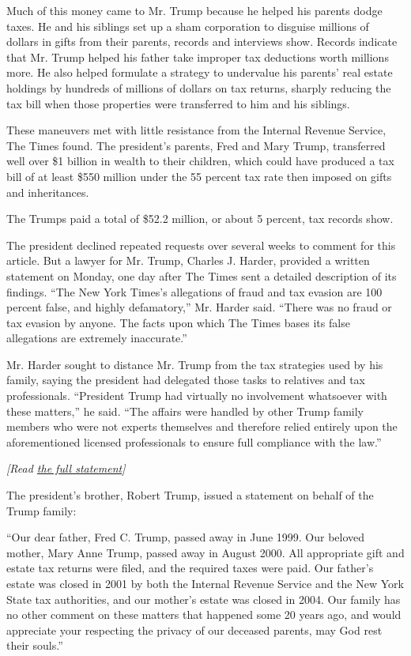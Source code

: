 Much of this money came to Mr. Trump because he helped his parents dodge
taxes. He and his siblings set up a sham corporation to disguise
millions of dollars in gifts from their parents, records and interviews
show. Records indicate that Mr. Trump helped his father take improper
tax deductions worth millions more. He also helped formulate a strategy
to undervalue his parents' real estate holdings by hundreds of millions
of dollars on tax returns, sharply reducing the tax bill when those
properties were transferred to him and his siblings.

These maneuvers met with little resistance from the Internal Revenue
Service, The Times found. The president's parents, Fred and Mary Trump,
transferred well over \$1 billion in wealth to their children, which
could have produced a tax bill of at least \$550 million under the 55
percent tax rate then imposed on gifts and inheritances.

The Trumps paid a total of \$52.2 million, or about 5 percent, tax
records show.

The president declined repeated requests over several weeks to comment
for this article. But a lawyer for Mr. Trump, Charles J. Harder,
provided a written statement on Monday, one day after The Times sent a
detailed description of its findings. ``The New York Times's allegations
of fraud and tax evasion are 100 percent false, and highly defamatory,''
Mr. Harder said. ``There was no fraud or tax evasion by anyone. The
facts upon which The Times bases its false allegations are extremely
inaccurate.''

Mr. Harder sought to distance Mr. Trump from the tax strategies used by
his family, saying the president had delegated those tasks to relatives
and tax professionals. ``President Trump had virtually no involvement
whatsoever with these matters,'' he said. ``The affairs were handled by
other Trump family members who were not experts themselves and therefore
relied entirely upon the aforementioned licensed professionals to ensure
full compliance with the law.''

\emph{{[}Read
\href{https://int.graylady3jvrrxbe.onion/data/documenthelper/353-trump-inheritance-taxes-statement/2986a100d3d19a917cdc/optimized/full.pdf\#page=1?action=click\&module=Intentional\&pgtype=Article}{the
full statement}{]}}

The president's brother, Robert Trump, issued a statement on behalf of
the Trump family:

``Our dear father, Fred C. Trump, passed away in June 1999. Our beloved
mother, Mary Anne Trump, passed away in August 2000. All appropriate
gift and estate tax returns were filed, and the required taxes were
paid. Our father's estate was closed in 2001 by both the Internal
Revenue Service and the New York State tax authorities, and our mother's
estate was closed in 2004. Our family has no other comment on these
matters that happened some 20 years ago, and would appreciate your
respecting the privacy of our deceased parents, may God rest their
souls.''

